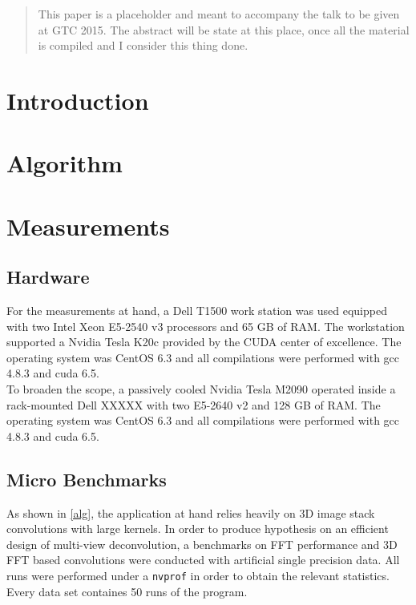 \documentclass [12pt]{article}
\title{}
\author{Peter Steinbach}
\begin{document}
\maketitle
\begin{abstract}
  This paper is a placeholder and meant to accompany the talk to be given at GTC 2015. The abstract will be state at this place, once all the material is compiled and I consider this thing done.
\end{abstract}

\section{Introduction}
\section[alg]{Algorithm}
\section{Measurements}

\subsection{Hardware}
For the measurements at hand, a Dell T1500 work station was used equipped with two Intel Xeon E5-2540 v3 processors and 65 GB of RAM. The workstation supported a Nvidia Tesla K20c provided by the CUDA center of excellence. The operating system was CentOS 6.3 and all compilations were performed with gcc 4.8.3 and cuda 6.5.\\ 
To broaden the scope, a passively cooled Nvidia Tesla M2090 operated inside a rack-mounted Dell XXXXX with two E5-2640 v2 and 128 GB of RAM. The operating system was CentOS 6.3 and all compilations were performed with gcc 4.8.3 and cuda 6.5.\\
 
\subsection{Micro Benchmarks}

As shown in \ref{alg}, the application at hand relies heavily on 3D image stack convolutions with large kernels. In order to produce hypothesis on an efficient design of multi-view deconvolution, a benchmarks on FFT performance and 3D FFT based convolutions were conducted with artificial single precision data. All runs were performed under a \texttt{nvprof} in order to obtain the relevant statistics. Every data set containes 50 runs of the program. 
\end{document}
